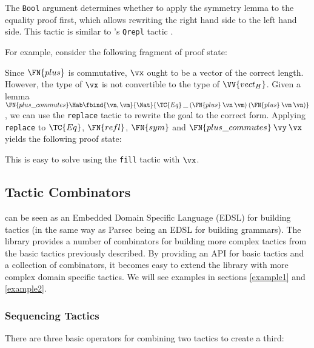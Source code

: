 The \texttt{Bool} argument determines whether to apply the symmetry
lemma to the equality proof first, which allows rewriting the right
hand side to the left hand side. This  tactic is
similar to \Lego{}'s \texttt{Qrepl} tactic \cite{lego-manual}.

For example, consider the following fragment of proof state:


Since $\FN{plus}$ is commutative, $\vx$ ought to be a vector of the
correct length. However, the type of $\vx$ is not convertible to the
type of $\VV{vect_H}$. Given a lemma $\FN{plus\_commutes}\Hab
\fbind{\vn,\vm}{\Nat}{\TC{Eq}\:\_\:(\FN{plus}\:\vn\:\vm)\:(\FN{plus}\:\vm\:\vn)}$,
we can use the \texttt{replace} tactic to rewrite the goal to the
correct form. Applying \texttt{replace} to $\TC{Eq}$, $\FN{refl}$,
$\FN{sym}$ and $\FN{plus\_commutes}\:\vy\:\vx$ yields the following
proof state:


This is easy to solve using the \texttt{fill} tactic with $\vx$.

\subsection{Tactic Combinators}

\Ivor{} can be seen as an Embedded Domain Specific Language (EDSL) for
building tactics (in the same way as Parsec \cite{parsec} being an
EDSL for building grammars). The library provides a number of
combinators for building more complex tactics from the basic tactics
previously described. By providing an API for basic tactics and a
collection of combinators, it becomes easy to extend the library with
more complex domain specific tactics. We will see examples in
sections \ref{example1} and \ref{example2}.

\subsubsection{Sequencing Tactics}

There are three basic operators for combining two tactics to create a third:

